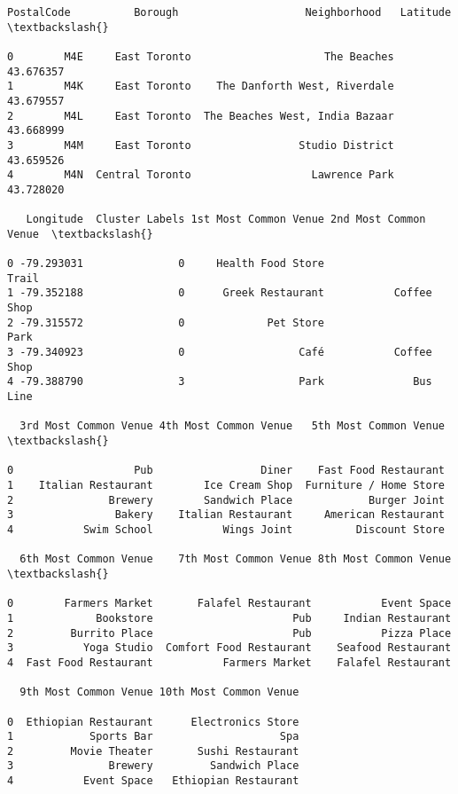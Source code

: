\documentclass[11pt]{article}
\makeatletter
\newcommand{\boxspacing}{\kern\kvtcb@left@rule\kern\kvtcb@boxsep}
\newcommand{\prompt}[4]{
        \ttfamily\llap{{\color{#2}[#3]:\hspace{3pt}#4}}\vspace{-\baselineskip}
    }
\makeatother
\begin{document}
            \begin{tcolorbox}[breakable, size=fbox, boxrule=.5pt, pad at break*=1mm, opacityfill=0]
\prompt{Out}{outcolor}{106}{\boxspacing}
\begin{Verbatim}[commandchars=\\\{\}]
  PostalCode          Borough                    Neighborhood   Latitude  \textbackslash{}

0        M4E     East Toronto                     The Beaches  43.676357
1        M4K     East Toronto    The Danforth West, Riverdale  43.679557
2        M4L     East Toronto  The Beaches West, India Bazaar  43.668999
3        M4M     East Toronto                 Studio District  43.659526
4        M4N  Central Toronto                   Lawrence Park  43.728020

   Longitude  Cluster Labels 1st Most Common Venue 2nd Most Common Venue  \textbackslash{}

0 -79.293031               0     Health Food Store                 Trail
1 -79.352188               0      Greek Restaurant           Coffee Shop
2 -79.315572               0             Pet Store                  Park
3 -79.340923               0                  Café           Coffee Shop
4 -79.388790               3                  Park              Bus Line

  3rd Most Common Venue 4th Most Common Venue   5th Most Common Venue  \textbackslash{}

0                   Pub                 Diner    Fast Food Restaurant
1    Italian Restaurant        Ice Cream Shop  Furniture / Home Store
2               Brewery        Sandwich Place            Burger Joint
3                Bakery    Italian Restaurant     American Restaurant
4           Swim School           Wings Joint          Discount Store

  6th Most Common Venue    7th Most Common Venue 8th Most Common Venue  \textbackslash{}

0        Farmers Market       Falafel Restaurant           Event Space
1             Bookstore                      Pub     Indian Restaurant
2         Burrito Place                      Pub           Pizza Place
3           Yoga Studio  Comfort Food Restaurant    Seafood Restaurant
4  Fast Food Restaurant           Farmers Market    Falafel Restaurant

  9th Most Common Venue 10th Most Common Venue

0  Ethiopian Restaurant      Electronics Store
1            Sports Bar                    Spa
2         Movie Theater       Sushi Restaurant
3               Brewery         Sandwich Place
4           Event Space   Ethiopian Restaurant
\end{Verbatim}
\end{tcolorbox}
        
\end{document}
